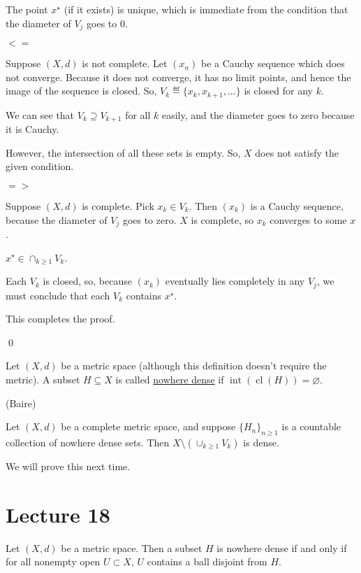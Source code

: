 \documentclass[x11names,reqno,14pt]{extarticle}
\DeclareMathOperator{\cl}{cl}
\begin{document}
\rem

The point $x^\star$ (if it exists) is unique, which is immediate from the condition that the diameter of $V_j$ goes to 0.

\proof

\underline{$<=$}

Suppose $(X, d)$ is not complete. Let $(x_n)$ be a Cauchy sequence which does not converge. Because it does not converge, it has no limit points, and hence the image of the sequence is closed. So, $V_k \eqdef \{x_k, x_{k + 1}, \dots \}$ is closed for any $k$. 

We can see that $V_k \supseteq V_{k + 1}$ for all $k$ easily, and the diameter goes to zero because it is Cauchy. 

However, the intersection of all these sets is empty. So, $X$ does not satisfy the given condition. 

\underline{$=>$}

Suppose $(X, d)$ is complete. Pick $x_k \in V_k$. Then $(x_k)$ is a Cauchy sequence, because the diameter of $V_j$ goes to zero. $X$ is complete, so $x_k$ converges to some $x$. 

\claim 

$x^\star \in \cap_{k\geq 1}V_k$. 

\proof

Each $V_k$ is closed, so, because $(x_k)$ eventually lies completely in any $V_j$, we must conclude that each $V_k$ contains $x^\star$. 

This completes the proof. 

\qed


Let $(X, d)$ be a metric space (although this definition doesn't require the metric). A subset $H\subseteq X$ is called \underline{nowhere dense} if $\operatorname{int}(\cl(H)) = \varnothing$. 

\thm (Baire)

Let $(X, d)$ be a complete metric space, and suppose $\{H_n\}_{n\geq1}$ is a countable collection of nowhere dense sets. Then $X\setminus\left(\cup_{k\geq1}V_k\right)$ is dense. 

We will prove this next time. 

\section*{Lecture 18}

\lem

Let $(X, d)$ be a metric space. Then a subset $H$ is nowhere dense if and only if for all nonempty open $U \subset X$, $U$ contains a ball disjoint from $H$. 
\end{document}
